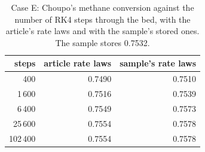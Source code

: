 \documentclass[preprint,12pt]{elsarticle}
\begin{document}
\begin{table}[t]
\centering\scriptsize
\caption{Case E: Choupo's methane conversion against the number of RK4
steps through the bed, with the article's rate laws and with the sample's
stored ones.  The sample stores 0.7532.}
\label{tab:grid}
\begin{tabular}{rrr}
\toprule
\textbf{steps} & \textbf{article rate laws} & \textbf{sample's rate laws} \\
\midrule
400 & 0.7490 & 0.7510 \\
1\,600 & 0.7516 & 0.7539 \\
6\,400 & 0.7549 & 0.7573 \\
25\,600 & 0.7554 & 0.7578 \\
102\,400 & 0.7554 & 0.7578 \\
\bottomrule
\end{tabular}
\end{table}
\end{document}
